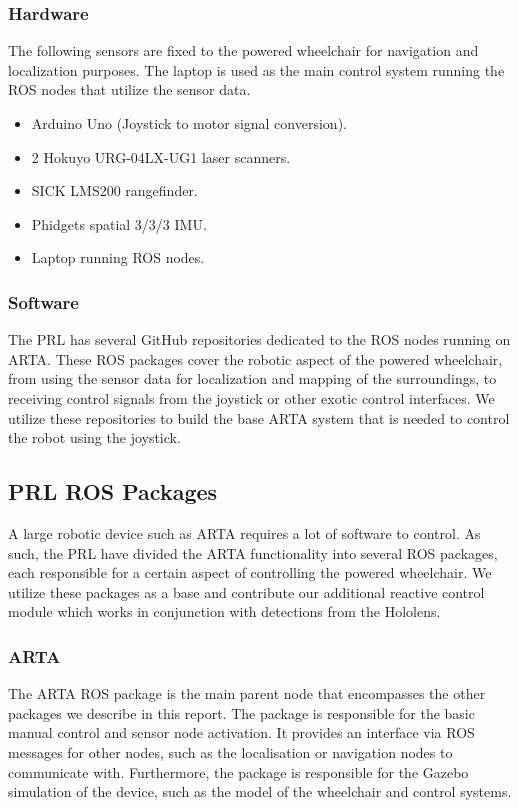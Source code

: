 \subsubsection{Hardware}
The following sensors are fixed to the powered wheelchair for navigation and localization purposes. The laptop is used as the main control system running the ROS nodes that utilize the sensor data. 

\begin{itemize}
	\item Arduino Uno (Joystick to motor signal conversion).
	\item 2 Hokuyo URG-04LX-UG1 laser scanners.
	\item SICK LMS200 rangefinder.
	\item Phidgets spatial 3/3/3 IMU.
	\item Laptop running ROS nodes.
\end{itemize}

\subsubsection{Software}
The PRL has several GitHub repositories dedicated to the ROS nodes running on ARTA. These ROS packages cover the robotic aspect of the powered wheelchair, from using the sensor data for localization and mapping of the surroundings, to receiving control signals from the joystick or other exotic control interfaces. We utilize these repositories to build the base ARTA system that is needed to control the robot using the joystick.

\subsection{PRL ROS Packages}
A large robotic device such as ARTA requires a lot of software to control. As such, the PRL have divided the ARTA functionality into several ROS packages, each responsible for a certain aspect of controlling the powered wheelchair. We utilize these packages as a base and contribute our additional reactive control module which works in conjunction with detections from the Hololens.

\subsubsection{ARTA}
The ARTA ROS package is the main parent node that encompasses the other packages we describe in this report. The package is responsible for the basic manual control and sensor node activation. It provides an interface via ROS messages for other nodes, such as the localisation or navigation nodes to communicate with. Furthermore, the package is responsible for the Gazebo simulation of the device, such as the model of the wheelchair and control systems.

